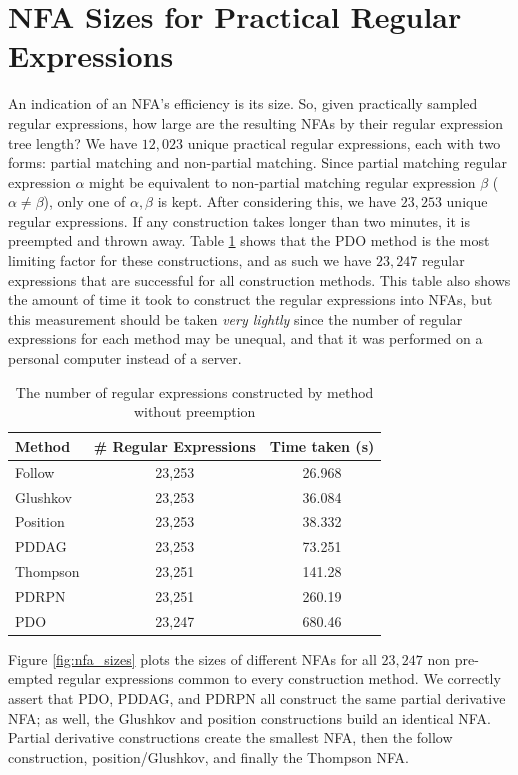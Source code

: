 \section{NFA Sizes for Practical Regular Expressions}
\label{sec:NFA Sizes for Practical Regular Expressions}
An indication of an NFA's efficiency is its size. So, given practically sampled regular expressions, how large are the resulting NFAs by their regular expression tree length? We have $12,023$ unique practical regular expressions, each with two forms: partial matching and non-partial matching. Since partial matching regular expression $\alpha$ might be equivalent to non-partial matching regular expression $\beta$ ($\alpha \neq \beta$), only one of $\alpha, \beta$ is kept. After considering this, we have $23,253$ unique regular expressions. If any construction takes longer than two minutes, it is preempted and thrown away. Table \ref{tbl:nfa sizes} shows that the PDO method is the most limiting factor for these constructions, and as such we have $23,247$ regular expressions that are successful for all construction methods. This table also shows the amount of time it took to construct the regular expressions into NFAs, but this measurement should be taken \emph{very lightly} since the number of regular expressions for each method may be unequal, and that it was performed on a personal computer instead of a server.

\begin{table}[H]
  \center
  \begin{tabular}{l|c|c}
    Method & \# Regular Expressions & Time taken (s) \\
    \hline
    Follow     & 23,253 & 26.968 \\
    Glushkov   & 23,253 & 36.084 \\
    Position   & 23,253 & 38.332 \\
    PDDAG      & 23,253 & 73.251 \\
    Thompson   & 23,251 & 141.28 \\
    PDRPN      & 23,251 & 260.19 \\
    PDO        & 23,247 & 680.46 \\
  \end{tabular}
  \caption{The number of regular expressions constructed by method without preemption}
  \label{tbl:nfa sizes}
\end{table}

Figure \ref{fig:nfa_sizes} plots the sizes of different NFAs for all $23,247$ non pre-empted regular expressions common to every construction method. We correctly assert that PDO, PDDAG, and PDRPN all construct the same partial derivative NFA; as well, the Glushkov and position constructions build an identical NFA. Partial derivative constructions create the smallest NFA, then the follow construction, position/Glushkov, and finally the Thompson NFA.

